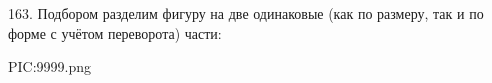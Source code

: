 163. Подбором разделим фигуру на две одинаковые (как по размеру, так и по форме с учётом переворота) части:
\begin{center}
{{PIC:9999.png}}
\end{center}
